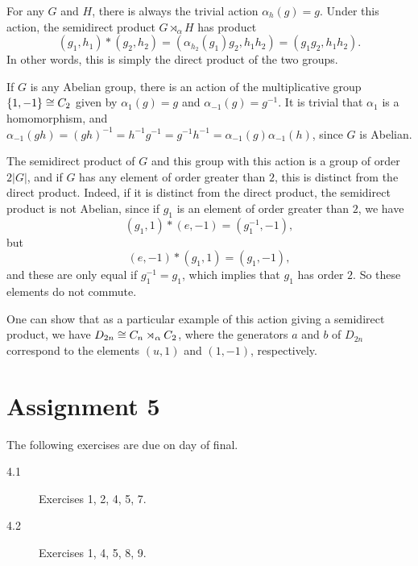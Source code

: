 \begin{example}
  For any $G$ and $H$, there is always the trivial action $\alpha_{h}(g) = g$.
  Under this action, the semidirect product $G \rtimes_{\alpha} H$ has product
  \[
    (g_{1}, h_{1}) \ast (g_{2}, h_{2}) =
      (\alpha_{h_{2}}(g_{1})g_{2}, h_{1}h_{2})
      = (g_{1}g_{2}, h_{1}h_{2}).
  \]
  In other words, this is simply the direct product of the two groups.
\end{example}

\begin{example}
  If $G$ is any Abelian group, there is an action of the multiplicative
  group $\{1, -1\} \cong C_{2}$ given by $\alpha_{1}(g) = g$ and
  $\alpha_{-1}(g) = g^{-1}$.  It is trivial that $\alpha_{1}$ is a
  homomorphism, and $\alpha_{-1}(gh) = (gh)^{-1} = h^{-1}g^{-1} =
  g^{-1}h^{-1} = \alpha_{-1}(g)\alpha_{-1}(h)$, since $G$ is Abelian.
  
  The semidirect product of $G$ and this group with this action is a group
  of order $2|G|$, and if $G$ has any element of order greater than $2$, this
  is distinct from the direct product.  Indeed, if it is distinct from
  the direct product, the semidirect product is not Abelian, since if $g_{1}$
  is an element of order greater than $2$, we have
  \[
    (g_{1}, 1) \ast (e, -1) = (g_{1}^{-1}, -1),
  \]
  but
  \[
    (e, -1) \ast (g_{1}, 1) = (g_{1}, -1),
  \]
  and these are only equal if $g_{1}^{-1} = g_{1}$, which implies that
  $g_{1}$ has order $2$.  So these elements do not commute.
  
  One can show that as a particular example of this action giving a semidirect
  product, we have $D_{2n} \cong C_{n} \rtimes_{\alpha} C_{2}$, where the
  generators $a$ and $b$ of $D_{2n}$ correspond to the elements $(u,1)$ and
  $(1,-1)$, respectively.
\end{example}


\newpage
\section*{Assignment 5}

The following exercises are due on day of final.

\begin{description}
  \item[4.1] Exercises 1, 2, 4, 5, 7.
  \item[4.2] Exercises 1, 4, 5, 8, 9.
\end{description}
